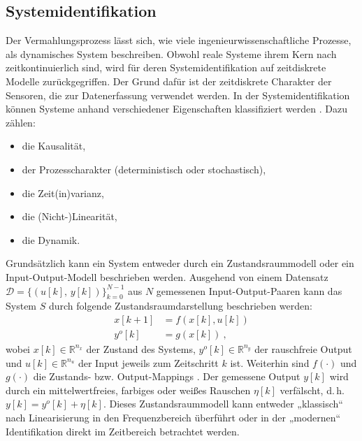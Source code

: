 \subsection{Systemidentifikation} \label{sec:systemidentifikation}
%
Der Vermahlungsprozess lässt sich, wie viele ingenieurwissenschaftliche Prozesse, als dynamisches System beschreiben. Obwohl reale Systeme ihrem Kern nach zeitkontinuierlich sind, wird für deren Systemidentifikation auf zeitdiskrete Modelle zurückgegriffen. Der Grund dafür ist der zeitdiskrete Charakter der Sensoren, die zur Datenerfassung verwendet werden. In der Systemidentifikation können Systeme anhand verschiedener Eigenschaften klassifiziert werden \cite{keesman.2011}. Dazu zählen:
%
\begin{itemize}
    \item die Kausalität,
    \item der Prozesscharakter (deterministisch oder stochastisch),
    \item die Zeit(in)varianz,
    \item die (Nicht-)Linearität,
    \item die Dynamik.
\end{itemize}
%
Grundsätzlich kann ein System entweder durch ein Zustandsraummodell oder ein Input-Output-Modell beschrieben werden.
Ausgehend von einem Datensatz $\mathcal{D} = \{(u[k],\, y[k])\}_{k=0}^{N-1}$ aus $N$ gemessenen Input-Output-Paaren kann das System $S$ durch folgende Zustandsraumdarstellung beschrieben werden:
%
\begin{equation}
    \begin{aligned}
        x[k+1] &= f(x[k], u[k]) \\
        y^o[k] &= g(x[k]) \ \text{,}
    \end{aligned}
    \label{eq:zustandsraum}
\end{equation}
%
wobei $x[k] \in \mathbb{R}^{n_x}$ der Zustand des Systems, $y^o[k] \in \mathbb{R}^{n_y}$ der rauschfreie Output und $u[k] \in \mathbb{R}^{n_u}$ der Input jeweils zum Zeitschritt $k$ ist. Weiterhin sind $f(\cdot)$ und $g(\cdot)$ die Zustands- bzw. Output-Mappings \cite{keesman.2011}. Der gemessene Output $y[k]$ wird durch ein mittelwertfreies, farbiges oder weißes Rauschen $\eta[k]$ verfälscht, d.\,h. $y[k]=y^o[k]+\eta[k]$. Dieses Zustandsraummodell kann entweder „klassisch“ nach Linearisierung in den Frequenzbereich überführt oder in der „modernen“ Identifikation direkt im Zeitbereich betrachtet werden.
